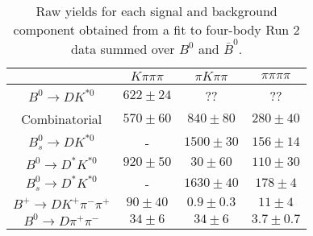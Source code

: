 \begin{table}
  \centering
  \begin{tabular}{cccc}
      \toprule
       & $K\pi\pi\pi$ & $\pi K\pi\pi$ & $\pi\pi\pi\pi$ \\
      \midrule
      $B^0 \to DK^{*0}$ & $622 \pm 24$ & ?? & ?? \\
      Combinatorial & $570 \pm 60$ & $840 \pm 80$ & $280 \pm 40$ \\
      $B^0_s \to DK^{*0}$ & \-- & $1500 \pm 30$ & $156 \pm 14$ \\
      $B^0 \to D^*K^{*0}$ & $920 \pm 50$ & $30 \pm 60$ & $110 \pm 30$ \\
      $B^0_s \to D^*K^{*0}$ & \-- & $1630 \pm 40$ & $178 \pm 4$ \\
      $B^+ \to DK^+\pi^-\pi^+$ & $90 \pm 40$ & $0.9 \pm 0.3$ & $11 \pm 4$ \\
      $B^0 \to D\pi^+\pi^-$ & $34 \pm 6$ & $34 \pm 6$ & $3.7 \pm 0.7$ \\
      \bottomrule
      \end{tabular}
  \caption{Raw yields for each signal and background component obtained from a fit to four-body Run 2 data summed over $B^0$ and $\bar{B}^0$.}
\label{tab:yields_combined_4body_run2}
\end{table}
